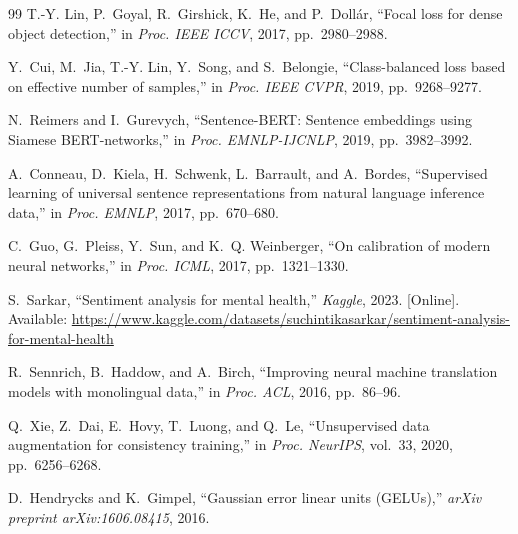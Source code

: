 \documentclass[conference, 10pt]{IEEEtran}
\begin{document}
\begin{thebibliography}{99}
T.-Y. Lin, P.~Goyal, R.~Girshick, K.~He, and P.~Doll\'{a}r, ``Focal loss for dense object detection,'' in \textit{Proc. IEEE ICCV}, 2017, pp.~2980--2988.

Y.~Cui, M.~Jia, T.-Y. Lin, Y.~Song, and S.~Belongie, ``Class-balanced loss based on effective number of samples,'' in \textit{Proc. IEEE CVPR}, 2019, pp.~9268--9277.

N.~Reimers and I.~Gurevych, ``Sentence-BERT: Sentence embeddings using Siamese BERT-networks,'' in \textit{Proc. EMNLP-IJCNLP}, 2019, pp.~3982--3992.

A.~Conneau, D.~Kiela, H.~Schwenk, L.~Barrault, and A.~Bordes, ``Supervised learning of universal sentence representations from natural language inference data,'' in \textit{Proc. EMNLP}, 2017, pp.~670--680.

C.~Guo, G.~Pleiss, Y.~Sun, and K.~Q. Weinberger, ``On calibration of modern neural networks,'' in \textit{Proc. ICML}, 2017, pp.~1321--1330.

S.~Sarkar, ``Sentiment analysis for mental health,'' \textit{Kaggle}, 2023. [Online]. Available: \url{https://www.kaggle.com/datasets/suchintikasarkar/sentiment-analysis-for-mental-health}

R.~Sennrich, B.~Haddow, and A.~Birch, ``Improving neural machine translation models with monolingual data,'' in \textit{Proc. ACL}, 2016, pp.~86--96.

Q.~Xie, Z.~Dai, E.~Hovy, T.~Luong, and Q.~Le, ``Unsupervised data augmentation for consistency training,'' in \textit{Proc. NeurIPS}, vol.~33, 2020, pp.~6256--6268.

D.~Hendrycks and K.~Gimpel, ``Gaussian error linear units (GELUs),'' \textit{arXiv preprint arXiv:1606.08415}, 2016.

\end{thebibliography}
\end{document}
